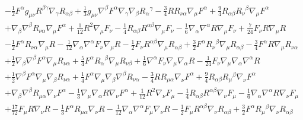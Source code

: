 \documentclass[10pt,letterpaper]{article}
\numberwithin{equation}{section}
\begin{document}
\begin{eqnarray}
&& -  \tfrac{1}{2} F^{\alpha } g_{\mu \nu } R^{\beta \gamma } \nabla_{\gamma }R_{\alpha \beta } + \tfrac{1}{3} g_{\mu \nu } \nabla^{\beta }F^{\alpha } \nabla_{\gamma }\nabla_{\beta }R_{\alpha }{}^{\gamma } -  \tfrac{3}{4} R R_{\nu \alpha } \nabla_{\mu }F^{\alpha } + \tfrac{9}{4} R_{\alpha \beta } R_{\nu }{}^{\beta } \nabla_{\mu }F^{\alpha } \nonumber \\ 
&& + \nabla_{\beta }\nabla^{\beta }R_{\nu \alpha } \nabla_{\mu }F^{\alpha } + \tfrac{1}{12} R^2 \nabla_{\mu }F_{\nu } -  \tfrac{1}{4} R_{\alpha \beta } R^{\alpha \beta } \nabla_{\mu }F_{\nu } -  \tfrac{1}{6} \nabla_{\alpha }\nabla^{\alpha }R \nabla_{\mu }F_{\nu } + \tfrac{7}{24} F_{\nu } R \nabla_{\mu }R \nonumber \\ 
&& -  \tfrac{1}{2} F^{\alpha } R_{\nu \alpha } \nabla_{\mu }R -  \tfrac{1}{12} \nabla_{\alpha }\nabla^{\alpha }F_{\nu } \nabla_{\mu }R -  \tfrac{1}{2} F_{\nu } R^{\alpha \beta } \nabla_{\mu }R_{\alpha \beta } + \tfrac{3}{2} F^{\alpha } R_{\nu }{}^{\beta } \nabla_{\mu }R_{\alpha \beta } -  \tfrac{3}{4} F^{\alpha } R \nabla_{\mu }R_{\nu \alpha } \nonumber \\ 
&& + \tfrac{1}{2} \nabla_{\beta }\nabla^{\beta }F^{\alpha } \nabla_{\mu }R_{\nu \alpha } + \tfrac{5}{4} F^{\alpha } R_{\alpha }{}^{\beta } \nabla_{\mu }R_{\nu \beta } + \tfrac{1}{6} \nabla^{\alpha }F_{\nu } \nabla_{\mu }\nabla_{\alpha }R -  \tfrac{1}{24} F_{\nu } \nabla_{\mu }\nabla_{\alpha }\nabla^{\alpha }R \nonumber \\ 
&& + \tfrac{1}{2} \nabla^{\beta }F^{\alpha } \nabla_{\mu }\nabla_{\beta }R_{\nu \alpha } + \tfrac{1}{4} F^{\alpha } \nabla_{\mu }\nabla_{\beta }\nabla^{\beta }R_{\nu \alpha } -  \tfrac{3}{4} R R_{\mu \alpha } \nabla_{\nu }F^{\alpha } + \tfrac{9}{4} R_{\alpha \beta } R_{\mu }{}^{\beta } \nabla_{\nu }F^{\alpha } \nonumber \\ 
&& + \nabla_{\beta }\nabla^{\beta }R_{\mu \alpha } \nabla_{\nu }F^{\alpha } -  \tfrac{1}{3} \nabla_{\mu }\nabla_{\alpha }R \nabla_{\nu }F^{\alpha } + \tfrac{1}{12} R^2 \nabla_{\nu }F_{\mu } -  \tfrac{1}{4} R_{\alpha \beta } R^{\alpha \beta } \nabla_{\nu }F_{\mu } -  \tfrac{1}{6} \nabla_{\alpha }\nabla^{\alpha }R \nabla_{\nu }F_{\mu } \nonumber \\ 
&& + \tfrac{17}{72} F_{\mu } R \nabla_{\nu }R -  \tfrac{1}{3} F^{\alpha } R_{\mu \alpha } \nabla_{\nu }R -  \tfrac{1}{12} \nabla_{\alpha }\nabla^{\alpha }F_{\mu } \nabla_{\nu }R -  \tfrac{1}{2} F_{\mu } R^{\alpha \beta } \nabla_{\nu }R_{\alpha \beta } + \tfrac{3}{2} F^{\alpha } R_{\mu }{}^{\beta } \nabla_{\nu }R_{\alpha \beta } \nonumber \\ 

\end{eqnarray}
\end{document}
